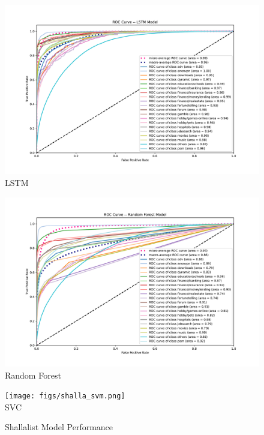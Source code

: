 \documentclass[12pt, letterpaper]{article}
\begin{document}
\begin{figure}[!htb]
\centering
\caption{Shallalist Model Performance}\label{shalla_lstm_rf_svm}
	\begin{minipage}[b]{0.3\textwidth}
	\centering
	\label{toulouse_lstm}
	\includegraphics[width=\textwidth]{figs/roc-shalla-2017-lstm.pdf}\\LSTM
	\end{minipage}
	\begin{minipage}[b]{0.3\textwidth}
	\centering
	\label{toulouse_rf}
	\includegraphics[width=\textwidth]{figs/roc-shalla-2017-rf.pdf}\\Random Forest
	\end{minipage}
	\begin{minipage}[b]{0.3\textwidth}
	\centering
	\label{toulouse_rf}
	\texttt{[image: figs/shalla\_svm.png]}\\SVC
	\end{minipage}
\end{figure}
\end{document}
